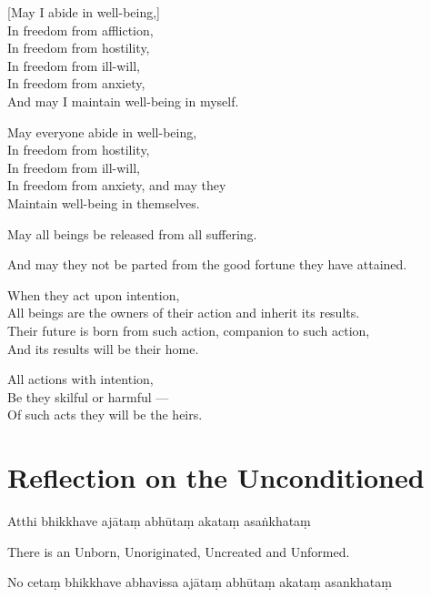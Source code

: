 
[May I abide in well-being,]\\
In freedom from affliction,\\
In freedom from hostility,\\
In freedom from ill-will,\\
In freedom from anxiety,\\
And may I maintain well-being in myself.

May everyone abide in well-being,\\
In freedom from hostility,\\
In freedom from ill-will,\\
In freedom from anxiety, and may they\\
Maintain well-being in themselves.

May all beings be released from all suffering.

And may they not be parted from the good fortune they have attained.

When they act upon intention,\\
All beings are the owners of their action and inherit its results.\\
Their future is born from such action, companion to such action,\\
And its results will be their home.

All actions with intention,\\
Be they skilful or harmful ---\\
Of such acts they will be the heirs.


\section[The Unconditioned]{Reflection on the Unconditioned}

\begin{leader}
\end{leader}


Atthi bhikkhave ajātaṃ abhūtaṃ akataṃ asaṅkhataṃ

\begin{english}
  There is an Unborn, Unoriginated, Uncreated and Unformed.
\end{english}

No cetaṃ bhikkhave abhavissa ajātaṃ abhūtaṃ akataṃ asankhataṃ

